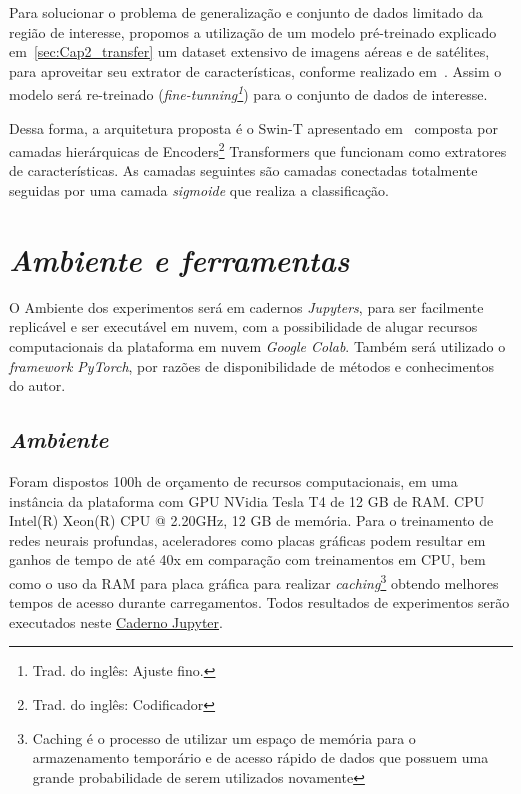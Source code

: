 Para solucionar o problema de generalização e conjunto de dados limitado da região de interesse, propomos a utilização de um modelo pré-treinado explicado em~\ref{sec:Cap2_transfer} um dataset extensivo de imagens aéreas e de satélites, para aproveitar seu extrator de características, conforme realizado em~\cite{wang2022empirical}. Assim o modelo será re-treinado (\textit{fine-tunning\footnote{Trad. do inglês: Ajuste fino.}}) para o conjunto de dados de interesse.

Dessa forma, a arquitetura proposta é o Swin-T apresentado em~\cite{liu2022swin}
composta por camadas hierárquicas de Encoders\footnote{Trad. do inglês: Codificador} Transformers  que funcionam como extratores de características. As camadas seguintes são camadas conectadas totalmente seguidas por uma camada \textit{sigmoide} que realiza a classificação.


\section{\textit{Ambiente e ferramentas}}\label{sec:Cap3_Ferramentas}


O Ambiente dos experimentos será em cadernos \textit{Jupyters}, para ser facilmente replicável e ser executável em nuvem, com a possibilidade de alugar recursos computacionais da plataforma em nuvem \textit{Google Colab}. Também será utilizado o \textit{framework PyTorch}, por razões de disponibilidade de métodos e conhecimentos do autor. 


\subsection{\textit{Ambiente}}\label{sec:Cap2_Ambiente}

Foram dispostos 100h de orçamento de recursos computacionais, em uma instância da plataforma com GPU NVidia Tesla T4 de 12 GB de RAM. CPU Intel(R) Xeon(R) CPU @ 2.20GHz, 12 GB de memória. Para o treinamento de redes neurais profundas, aceleradores como placas gráficas podem resultar em ganhos de tempo de até 40x em comparação com treinamentos em CPU, bem como o uso da RAM para placa gráfica para realizar \textit{caching}\footnote[1]{Caching é o processo de utilizar um espaço de memória para o armazenamento temporário e de acesso rápido de dados que possuem uma grande probabilidade de serem utilizados novamente} obtendo melhores tempos de acesso durante carregamentos. Todos resultados de experimentos serão executados neste \href{https://colab.research.google.com/github/vic-torr/thesis-experiments/blob/main/experiments/rsp_Swint_t_planet_portugues.ipynb}{Caderno Jupyter}.


